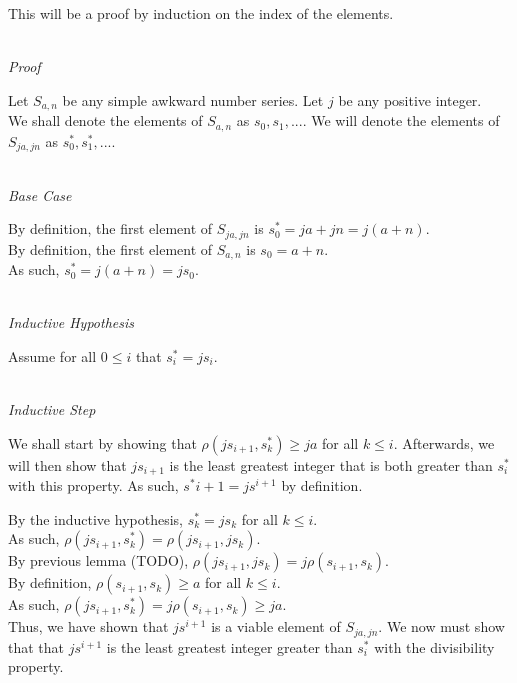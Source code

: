 \documentclass[a4paper,12pt]{article}
\begin{document}
\noindent This will be a proof by induction on the index of the elements.

\noindent \\
\textit{Proof}

\noindent Let $S_{a,n}$ be any simple awkward number series. Let $j$ be any positive integer.\\

\noindent We shall denote the elements of $S_{a,n}$ as $s_0, s_1, ...$. We will denote the elements of $S_{ja, jn}$ as $s^*_0, s^*_1, ...$.

\noindent \\
\textit{Base Case}

\noindent By definition, the first element of $S_{ja, jn}$ is $s^*_0 = ja + jn = j(a + n)$.\\

\noindent By definition, the first element of $S_{a,n}$ is $s_0 = a + n$.\\

\noindent As such, $s^*_0 = j(a + n) = js_0$.



\noindent \\
\textit{Inductive Hypothesis}

\noindent Assume for all $0 \leq i$ that $s^*_i = js_i$.


\noindent \\
\textit{Inductive Step}

\noindent We shall start by showing that $\rho(js_{i+1}, s^*_k) \geq ja$ for all $k \leq i$. Afterwards, we will then show that $js_{i+1}$ is the least greatest integer that is both greater than $s^*_i$ with this property. As such, $s^*{i+1} = js^{i+1}$ by definition.

\noindent By the inductive hypothesis, $s^*_k = js_k$ for all $k \leq i$.\\

\noindent As such, $\rho(js_{i+1}, s^*_k) = \rho(js_{i+1}, js_k)$.\\

\noindent By previous lemma (TODO), $\rho(js_{i+1}, js_k) = j \rho(s_{i+1}, s_k)$.\\

\noindent By definition, $\rho(s_{i+1}, s_k) \geq a$ for all $k \leq i$.\\

\noindent As such, $\rho(js_{i+1}, s^*_k) = j \rho(s_{i+1}, s_k) \geq ja$.\\

\noindent Thus, we have shown that $js^{i+1}$ is a viable element of $S_{ja, jn}$. We now must show that that $js^{i+1}$ is the least greatest integer greater than $s^*_i$ with the divisibility property.\\
\end{document}
